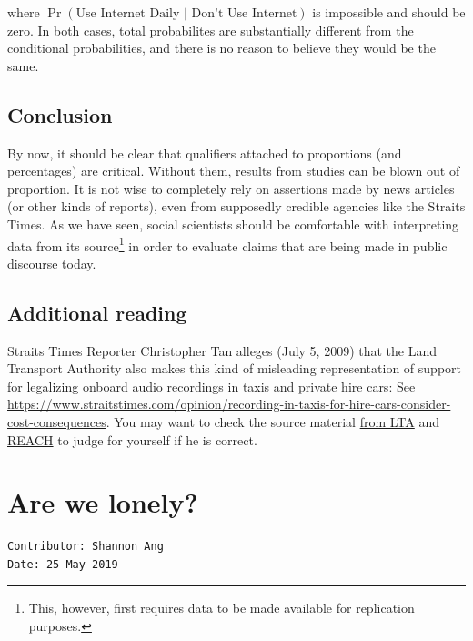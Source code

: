 \documentclass[openany]{book}
\let\rmarkdownfootnote\footnote%
\def\footnote{\protect\rmarkdownfootnote}
\begin{document}
where \(\Pr(\text{Use Internet Daily } | \text{ Don't Use Internet})\)
is impossible and should be zero. In both cases, total probabilites are
substantially different from the conditional probabilities, and there is
no reason to believe they would be the same.

\section{Conclusion}\label{conclusion}

By now, it should be clear that qualifiers attached to proportions (and
percentages) are critical. Without them, results from studies can be
blown out of proportion. It is not wise to completely rely on assertions
made by news articles (or other kinds of reports), even from supposedly
credible agencies like the Straits Times. As we have seen, social
scientists should be comfortable with interpreting data from its
source\footnote{This, however, first requires data to be made available
  for replication purposes.} in order to evaluate claims that are being
made in public discourse today.

\section{Additional reading}\label{additional-reading}

Straits Times Reporter Christopher Tan alleges (July 5, 2009) that the
Land Transport Authority also makes this kind of misleading
representation of support for legalizing onboard audio recordings in
taxis and private hire cars: See
\url{https://www.straitstimes.com/opinion/recording-in-taxis-for-hire-cars-consider-cost-consequences}.
You may want to check the source material
\href{https://www.lta.gov.sg/apps/news/page.aspx?c=2\&id=6157ec3f-4e45-4dcc-9c78-7d8506084576\#2}{from
LTA} and
\href{https://www.reach.gov.sg/~/media/2019/press-release/invehicle-recording-devices-poll-media-release.pdf}{REACH}
to judge for yourself if he is correct.

\chapter{Are we lonely?}\label{lonely}

\begin{verbatim}
Contributor: Shannon Ang
Date: 25 May 2019
\end{verbatim}
\end{document}
